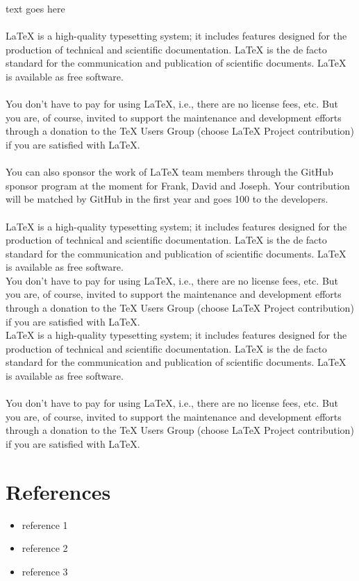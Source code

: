 \documentclass{article}
\begin{document}

\begin{text}
text goes here\\\\
LaTeX is a high-quality typesetting system; it includes features designed for the production of technical and scientific documentation. LaTeX is the de facto standard for the communication and publication of scientific documents. LaTeX is available as free software.\\\\You don't have to pay for using LaTeX, i.e., there are no license fees, etc. But you are, of course, invited to support the maintenance and development efforts through a donation to the TeX Users Group (choose LaTeX Project contribution) if you are satisfied with LaTeX.\\\\
You can also sponsor the work of LaTeX team members through the GitHub sponsor program at the moment for Frank, David and Joseph. Your contribution will be matched by GitHub in the first year and goes 100 to the developers.\\\\
LaTeX is a high-quality typesetting system; it includes features designed for the production of technical and scientific documentation. LaTeX is the de facto standard for the communication and publication of scientific documents. LaTeX is available as free software.\\

You don't have to pay for using LaTeX, i.e., there are no license fees, etc. But you are, of course, invited to support the maintenance and development efforts through a donation to the TeX Users Group (choose LaTeX Project contribution) if you are satisfied with LaTeX.\\
LaTeX is a high-quality typesetting system; it includes features designed for the production of technical and scientific documentation. LaTeX is the de facto standard for the communication and publication of scientific documents. LaTeX is available as free software.\\\\You don't have to pay for using LaTeX, i.e., there are no license fees, etc. But you are, of course, invited to support the maintenance and development efforts through a donation to the TeX Users Group (choose LaTeX Project contribution) if you are satisfied with LaTeX.
\end{text}

\section*{References}
\begin{itemize}
  \item reference 1
  \item reference 2
  \item reference 3
\end{itemize}
\end{document}
